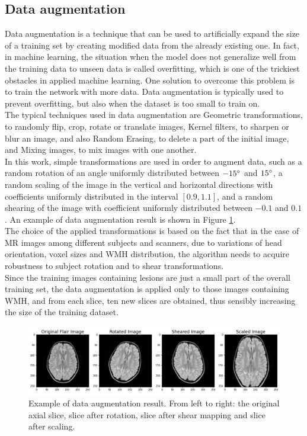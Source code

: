 \documentclass[12pt]{extarticle}
\begin{document}
\subsection{Data augmentation}\label{sec:data_aug}
Data augmentation is a technique that can be used to artificially expand the size of a training set by creating modified data from the already existing one. 
In fact, in machine learning, the situation when the model does not generalize well from the training data to unseen data is called overfitting, which is one of the trickiest obstacles in applied machine learning.
One solution to overcome this problem is to train the network with more data. 
Data augmentation is typically used to prevent overfitting, but also when the dataset is too small to train on. \\
The typical techniques used in data augmentation are Geometric transformations, to randomly flip, crop, rotate or translate images, Kernel filters, to sharpen or blur an image, and also Random Erasing, to delete a part of the initial image, and Mixing images, to mix images with one another. \\[4pt]
In this work, simple transformations are used in order to augment data, such as a random rotation of an angle uniformly distributed between $-15\degree$ and $15\degree$, a random scaling of the image in the vertical and horizontal directions with coefficients uniformly distributed in the interval $[0.9, 1.1]$, and a random shearing of the image with coefficient uniformly distributed between $-0.1$ and $0.1$. An example of data augmentation result is shown in Figure \ref{fig:data_aug}.\\
The choice of the applied transformations is based on the fact that in the case of MR images among different subjects and scanners, due to variations of head orientation, voxel sizes and WMH distribution, the algorithm needs to acquire robustness to subject rotation and to shear transformations. \\[4pt]
Since the training images containing lesions are just a small part of the overall training set, the data augmentation is applied only to those images containing WMH, and from each slice, ten new slices are obtained, thus sensibly increasing the size of the training dataset.
\begin{figure}[h!]
    \centering
    \includegraphics[width = \textwidth]{images/data_augmentation.png}
    \caption{Example of data augmentation result. From left to right: the original axial slice, slice after rotation, slice after shear mapping and slice after scaling.}
    \label{fig:data_aug}
\end{figure}
\end{document}
